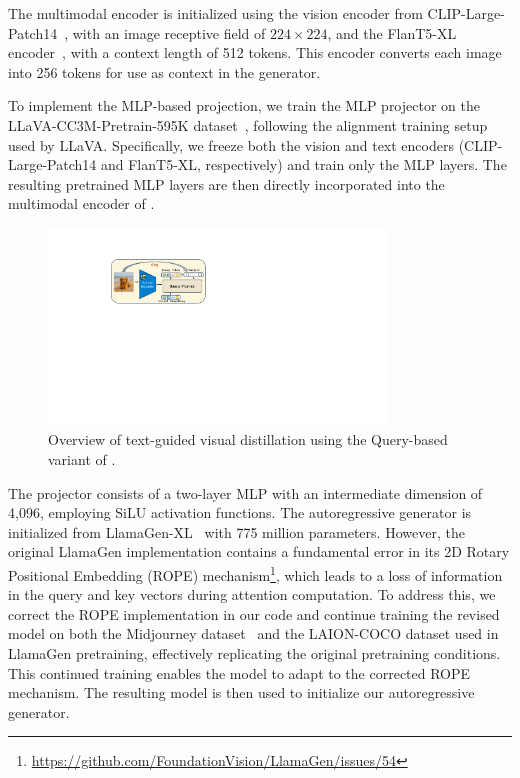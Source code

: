 The multimodal encoder is initialized using the vision encoder from CLIP-Large-Patch14~\citep{Radford2021LearningTV}, with an image receptive field of $224 \times 224$, and the FlanT5-XL encoder~\citep{flant5}, with a context length of 512 tokens. This encoder converts each image into 256 tokens for use as context in the generator.

To implement the MLP-based projection, we train the MLP projector on the LLaVA-CC3M-Pretrain-595K dataset~\citep{liu2023llava}, following the alignment training setup used by LLaVA. Specifically, we freeze both the vision and text encoders (CLIP-Large-Patch14 and FlanT5-XL, respectively) and train only the MLP layers. The resulting pretrained MLP layers are then directly incorporated into the multimodal encoder of \model.


\begin{figure}[htbp]
\centering
\includegraphics[width=0.8\textwidth]{figures/qformer.pdf}
\caption{Overview of text-guided visual distillation using the Query-based variant of \model.}
\label{fig:qformer}
\end{figure}

The projector consists of a two-layer MLP with an intermediate dimension of 4,096, employing SiLU activation functions.
The autoregressive generator is initialized from LlamaGen-XL~\citep{llamagen} with 775 million parameters. 
However, the original LlamaGen implementation contains a fundamental error in its 2D Rotary Positional Embedding\citep{lu2023unifiedio2,EVA-02} (ROPE) mechanism\footnote{\url{https://github.com/FoundationVision/LlamaGen/issues/54}}, which leads to a loss of information in the query and key vectors during attention computation. To address this, we correct the ROPE implementation in our code and continue training the revised model on both the Midjourney dataset~\citep{midjourney-niji-1m-llavanext} and the LAION-COCO dataset used in LlamaGen pretraining, effectively replicating the original pretraining conditions. This continued training enables the model to adapt to the corrected ROPE mechanism. The resulting model is then used to initialize our autoregressive generator.

